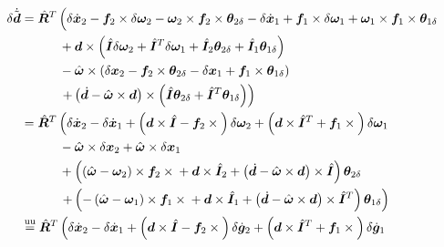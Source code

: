 \documentclass[10pt,fleqn,subeqn]{report}
\newcommand{\T}[1]{\bm{#1}}
\newcommand{\TT}[1]{\bm{#1}}
\newcommand{\equu}{\overset{\text{uu}}{=}}
\begin{document}
\begin{align}
	\delta\dot{\tilde{\T{d}}}
	&=
	\hat{\TT{R}}^T \lplbr{ \vphantom{\plbr{\hat{\TT{I}}^T}}
		\delta\dot{\T{x}}_2
		- \T{f}_2 \times \delta\T{\omega}_{2}
		- \T{\omega}_{2} \times \T{f}_2 \times \T{\theta}_{2\delta}
		- \delta\dot{\T{x}}_1
		+ \T{f}_1 \times \delta\T{\omega}_{1}
		+ \T{\omega}_{1} \times \T{f}_1 \times \T{\theta}_{1\delta}
	} \nonumber \\
	& \quad\quad\quad
	 	+ \T{d}\times\plbr{
			\hat{\TT{I}} \delta\T{\omega}_2
			+ \hat{\TT{I}}^T \delta\T{\omega}_1
			+ \hat{\TT{I}}_2 \T{\theta}_{2\delta}
			+ \hat{\TT{I}}_1 \T{\theta}_{1\delta}
		}
	\nonumber \\
	& \quad\quad\quad
		- \hat{\T{\omega}}\times\plbr{
			\delta\T{x}_2
			- \T{f}_2\times\T{\theta}_{2\delta}
			- \delta\T{x}_1
			+ \T{f}_1\times\T{\theta}_{1\delta}
		}
	\nonumber \\
	& \quad\quad\quad
	\rplbr{
		+ \plbr{
			\dot{\T{d}} - \hat{\T{\omega}}\times\T{d}
		} \times \plbr{
			\hat{\TT{I}} \T{\theta}_{2\delta}
			+ \hat{\TT{I}}^T \T{\theta}_{1\delta}
		}
	}
	\nonumber \\
	&=
	\hat{\TT{R}}^T \lplbr{ \vphantom{\plbr{\hat{\TT{I}}^T}}
		\delta\dot{\T{x}}_2
		- \delta\dot{\T{x}}_1
		+ \plbr{
			\T{d}\times\hat{\TT{I}}
			- \T{f}_2\times{}
		} \delta\T{\omega}_2
		+ \plbr{
			\T{d}\times\hat{\TT{I}}^T
			+ \T{f}_1\times{}
		} \delta\T{\omega}_1
	}
	\nonumber \\
	& \quad\quad\quad
		- \hat{\T{\omega}}\times\delta\T{x}_2
		+ \hat{\T{\omega}}\times\delta\T{x}_1
	\nonumber \\
	& \quad\quad\quad
		+ \plbr{
			\plbr{
				\hat{\T{\omega}}
				- \T{\omega}_2
			}\times\T{f}_2\times{}
			+ \T{d}\times\hat{\TT{I}}_2
			+ \plbr{
				\dot{\T{d}}
				- \hat{\T{\omega}}\times\T{d}
			}\times\hat{\TT{I}}
		} \T{\theta}_{2\delta}
	\nonumber \\
	& \quad\quad\quad
	\rplbr{
		+ \plbr{
			- \plbr{
				\hat{\T{\omega}}
				- \T{\omega}_1
			}\times\T{f}_1\times{}
			+ \T{d}\times\hat{\TT{I}}_1
			+ \plbr{
				\dot{\T{d}}
				- \hat{\T{\omega}}\times\T{d}
			}\times\hat{\TT{I}}^T
		} \T{\theta}_{1\delta}
	}
	\nonumber \\
	&\equu
	\hat{\TT{R}}^T \lplbr{ \vphantom{\plbr{\hat{\TT{I}}^T}}
		\delta\dot{\T{x}}_2
		- \delta\dot{\T{x}}_1
		+ \plbr{
			\T{d}\times\hat{\TT{I}}
			- \T{f}_2\times{}
		} \delta\dot{\T{g}}_2
		+ \plbr{
			\T{d}\times\hat{\TT{I}}^T
			+ \T{f}_1\times{}
		} \delta\dot{\T{g}}_1
	}
	\nonumber \\

\end{align}
\end{document}
